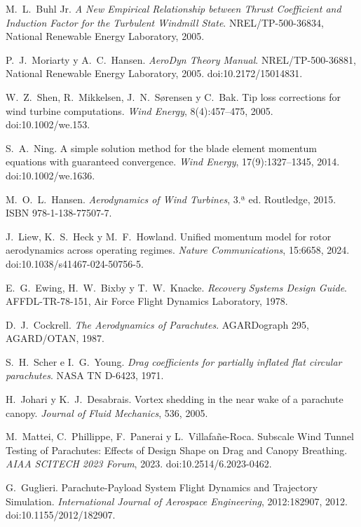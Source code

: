  M.~L.~Buhl Jr. \emph{A New Empirical Relationship between
  Thrust Coefficient and Induction Factor for the Turbulent Windmill State}. NREL/TP-500-36834,
  National Renewable Energy Laboratory, 2005.

 P.~J.~Moriarty y A.~C.~Hansen. \emph{AeroDyn Theory
  Manual}. NREL/TP-500-36881, National Renewable Energy Laboratory, 2005.
  doi:10.2172/15014831.

 W.~Z.~Shen, R.~Mikkelsen, J.~N.~Sørensen y C.~Bak. Tip loss
  corrections for wind turbine computations. \emph{Wind Energy}, 8(4):457--475, 2005.
  doi:10.1002/we.153.

 S.~A.~Ning. A simple solution method for the blade element
  momentum equations with guaranteed convergence. \emph{Wind Energy}, 17(9):1327--1345,
  2014. doi:10.1002/we.1636.

 M.~O.~L.~Hansen. \emph{Aerodynamics of Wind Turbines},
  3.ª ed. Routledge, 2015. ISBN 978-1-138-77507-7.

 J.~Liew, K.~S.~Heck y M.~F.~Howland. Unified momentum model
  for rotor aerodynamics across operating regimes. \emph{Nature Communications}, 15:6658,
  2024. doi:10.1038/s41467-024-50756-5.

 E.~G.~Ewing, H.~W.~Bixby y T.~W.~Knacke. \emph{Recovery
  Systems Design Guide}. AFFDL-TR-78-151, Air Force Flight Dynamics Laboratory, 1978.

 D.~J.~Cockrell. \emph{The Aerodynamics of Parachutes}.
  AGARDograph 295, AGARD/OTAN, 1987.

 S.~H.~Scher e I.~G.~Young. \emph{Drag coefficients for
  partially inflated flat circular parachutes}. NASA TN D-6423, 1971.

 H.~Johari y K.~J.~Desabrais. Vortex shedding in the near
  wake of a parachute canopy. \emph{Journal of Fluid Mechanics}, 536, 2005.

 M.~Mattei, C.~Phillippe, F.~Panerai y L.~Villafañe-Roca.
  Subscale Wind Tunnel Testing of Parachutes: Effects of Design Shape on Drag and Canopy
  Breathing. \emph{AIAA SCITECH 2023 Forum}, 2023. doi:10.2514/6.2023-0462.

 G.~Guglieri. Parachute-Payload System Flight Dynamics
  and Trajectory Simulation. \emph{International Journal of Aerospace Engineering},
  2012:182907, 2012. doi:10.1155/2012/182907.
